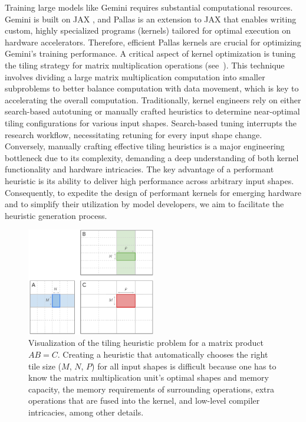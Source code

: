 Training large models like Gemini requires substantial computational resources. Gemini is built on JAX \cite{jax2018github}, and Pallas is an extension to JAX that enables writing custom, highly specialized programs (kernels) tailored for optimal execution on hardware accelerators. Therefore, efficient Pallas kernels are crucial for optimizing Gemini’s training performance. A critical aspect of kernel optimization is tuning the tiling strategy for matrix multiplication operations (see~). This technique involves dividing a large matrix multiplication computation into smaller subproblems to better balance computation with data movement, which is key to accelerating the overall computation. Traditionally, kernel engineers rely on either search-based autotuning or manually crafted heuristics to determine near-optimal tiling configurations for various input shapes. Search-based tuning interrupts the research workflow, necessitating retuning for every input shape change. Conversely, manually crafting effective tiling heuristics is a major engineering bottleneck due to its complexity, demanding a deep understanding of both kernel functionality and hardware intricacies. The key advantage of a performant heuristic is its ability to deliver high performance across arbitrary input shapes. Consequently, to expedite the design of performant kernels for emerging hardware and to simplify their utilization by model developers, we aim to facilitate the heuristic generation process.

\begin{figure}[t]
    \centering
    \includegraphics[width=0.5\textwidth]{figures/matmul_tiling_figure.pdf}
    \caption{Visualization of the tiling heuristic problem for a matrix  product $AB = C$. Creating a heuristic that automatically chooses the right tile size ($M$, $N$, $P$) for all input shapes is difficult because one has to know the matrix multiplication unit’s optimal shapes and memory capacity, the memory requirements of surrounding operations, extra operations that are fused into the kernel, and low-level compiler intricacies, among other details.}
    \label{fig:tiling_heuristic}
\end{figure}

